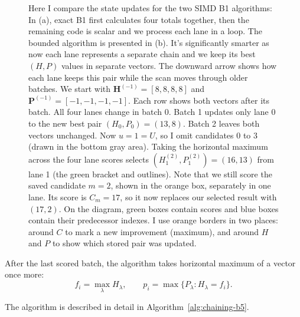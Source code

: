 \begin{figure}[H]
\caption{Here I compare the state updates for the two SIMD B1 algorithms:
In (a), exact B1 first calculates four totals together, then the remaining code is scalar and we process each lane in a loop.
The bounded algorithm is presented in (b). It's significantly smarter as now each lane represents a separate chain and we keep its best \((H,P)\) values in separate vectors. The downward arrow shows how each lane keeps this pair while the scan moves through older batches.
We start with \(\mathbf H^{(-1)}=[8,8,8,8]\) and
\(\mathbf P^{(-1)}=[-1,-1,-1,-1]\). Each row shows both vectors after its batch. All four lanes change in batch 0. Batch 1 updates only lane 0 to the new best pair \((H_0,P_0)=(13,8)\).
Batch 2 leaves both vectors unchanged. Now \(u=1=U\), so I omit
candidates 0 to 3 (drawn in the bottom gray area).
Taking the horizontal maximum across the four lane scores selects
\((H^{(2)}_1,P^{(2)}_1)=(16,13)\) from lane 1 (the green bracket and outlines).
Note that we still score the saved candidate \(m=2\), shown in the orange box, separately
in one lane. Its score is \(C_m=17\), so it now replaces our selected result with \((17,2)\).
On the diagram, green boxes contain scores and blue boxes contain their
predecessor indexes. I use orange borders in two places: around \(C\) to
mark a new improvement (maximum), and around \(H\) and \(P\) to show which
stored pair was updated.}
\label{fig:chaining-b5-batches}
\end{figure}

After the last scored batch, the algorithm takes horizontal maximum of a vector once more:
\begin{equation}
 f_i=\max_\lambda H_\lambda,
 \qquad
 p_i=\max\{P_\lambda:H_\lambda=f_i\}.
 \label{eq:chaining-b5-horizontal-reduction}
\end{equation}

The algorithm is described in detail in Algorithm~\ref{alg:chaining-b5}.

